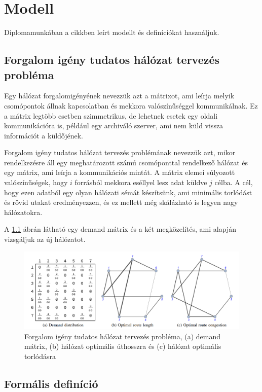 \documentclass[12pt]{report}
\begin{document}
\chapter{Modell}


Diplomamunkában a \cite{avin_demand-aware_nodate} cikkben leírt modellt és definíciókat használjuk.

\section{Forgalom igény tudatos hálózat tervezés probléma}

Egy hálózat forgalomigényének nevezzük azt a mátrixot, ami leírja melyik csomópontok állnak kapcsolatban és mekkora valószínűséggel kommunikálnak.
Ez a mátrix legtöbb esetben szimmetrikus, de lehetnek esetek egy oldali kommunikációra is, például egy archiváló szerver, ami nem küld vissza információt a küldőjének.

Forgalom igény tudatos hálózat tervezés problémának nevezzük azt, mikor rendelkezésre áll egy meghatározott számú csomóponttal rendelkező hálózat és egy mátrix, ami leírja a kommunikációs mintát.
A mátrix elemei súlyozott valószínűségek, hogy $i$ forrásból mekkora eséllyel lesz adat küldve $j$ célba.
A cél, hogy ezen adatból egy olyan hálózati sémát készítsünk, ami minimális torlódást és rövid utakat eredményezzen, és ez mellett még skálázható is legyen nagy hálózatokra.

A \ref{network_types} ábrán látható egy demand mátrix és a két megközelítés, ami alapján vizsgáljuk az új hálózatot.

\begin{figure}[h]
	\centering
	\includegraphics[width=14cm]{pictures/example.png}
	\caption{Forgalom igény tudatos hálózat tervezés probléma, (a) demand mátrix, (b) hálózat optimális úthosszra és (c) hálózat optimális torlódásra}
	\label{network_types}
\end{figure}

\section{Formális definíció}
\end{document}
